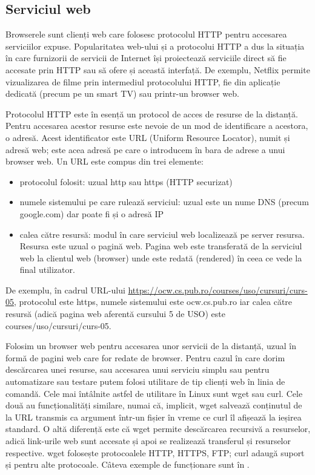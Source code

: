 \subsection{Serviciul web}
\label{sec:net:web}

Browserele sunt clienți web care folosesc protocolul HTTP pentru accesarea serviciilor expuse. Popularitatea web-ului și a protocolui HTTP a dus la situația în care furnizorii de servicii de Internet își proiectează serviciile direct să fie accesate prin HTTP sau să ofere și această interfață. De exemplu, Netflix permite vizualizarea de filme prin intermediul protocolului HTTP, fie din aplicație dedicată (precum pe un smart TV) sau printr-un browser web.

Protocolul HTTP este în esență un protocol de acces de resurse de la distanță. Pentru accesarea acestor resurse este nevoie de un mod de identificare a acestora, o adresă. Acest identificator este URL (Uniform Resource Locator), numit și adresă web; este acea adresă pe care o introducem în bara de adrese a unui browser web. Un URL este compus din trei elemente:

\begin{itemize}
  \item protocolul folosit: uzual http sau https (HTTP securizat)
  \item numele sistemului pe care rulează serviciul: uzual este un nume DNS (precum google.com) dar poate fi și o adresă IP
  \item calea către resursă: modul în care serviciul web localizează pe server resursa. Resursa este uzual o pagină web. Pagina web este transferată de la serviciul web la clientul web (browser) unde este redată (rendered) în ceea ce vede la final utilizator.
\end{itemize}

De exemplu, în cadrul URL-ului \url{https://ocw.cs.pub.ro/courses/uso/cursuri/curs-05}, protocolul este https, numele sistemului este ocw.cs.pub.ro iar calea către resursă (adică pagina web aferentă cursului 5 de USO) este courses/uso/cursuri/curs-05.

Folosim un browser web pentru accesarea unor servicii de la distanță, uzual în formă de pagini web care for redate de browser. Pentru cazul în care dorim descărcarea unei resurse, sau accesarea unui serviciu simplu sau pentru automatizare sau testare putem folosi utilitare de tip clienți web în linia de comandă. Cele mai întâlnite astfel de utilitare în Linux sunt wget sau curl. Cele două au funcționalități similare, numai că, implicit, wget salvează conținutul de la URL transmis ca argument într-un fișier în vreme ce curl îl afișează la ieșirea standard. O altă diferență este că wget permite descărcarea recursivă a resurselor, adică link-urile web sunt accesate și apoi se realizează transferul și resurselor respective. wget folosește protocoalele HTTP, HTTPS, FTP; curl adaugă suport și pentru alte protocoale. Câteva exemple de funcționare sunt în .

